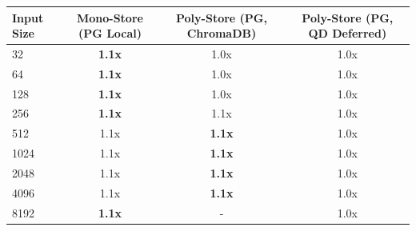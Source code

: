 \begin{tabular}{lccc}
\toprule
\textbf{Input Size} & \textbf{Mono-Store (PG Local)} & \textbf{Poly-Store (PG, ChromaDB)} & \textbf{Poly-Store (PG, QD Deferred)} \\
\midrule
32 & \textbf{1.1x} & 1.0x & 1.0x \\
64 & \textbf{1.1x} & 1.0x & 1.0x \\
128 & \textbf{1.1x} & 1.0x & 1.0x \\
256 & \textbf{1.1x} & 1.1x & 1.0x \\
512 & 1.1x & \textbf{1.1x} & 1.0x \\
1024 & 1.1x & \textbf{1.1x} & 1.0x \\
2048 & 1.1x & \textbf{1.1x} & 1.0x \\
4096 & 1.1x & \textbf{1.1x} & 1.0x \\
8192 & \textbf{1.1x} & - & 1.0x \\
\bottomrule
\end{tabular}
